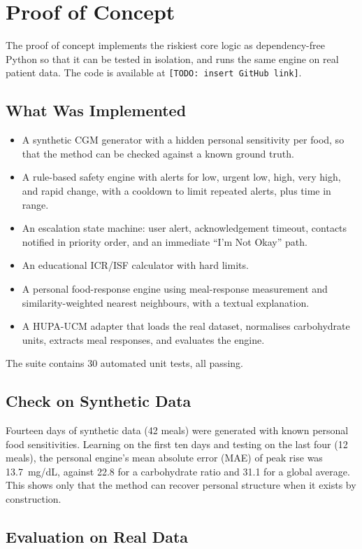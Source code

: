 \chapter{Proof of Concept}

The proof of concept implements the riskiest core logic as dependency-free Python so that it can be tested in isolation, and runs the same engine on real patient data. The code is available at \texttt{[TODO: insert GitHub link]}.

\section{What Was Implemented}
\begin{itemize}
  \item A synthetic CGM generator with a hidden personal sensitivity per food, so that the method can be checked against a known ground truth.
  \item A rule-based safety engine with alerts for low, urgent low, high, very high, and rapid change, with a cooldown to limit repeated alerts, plus time in range.
  \item An escalation state machine: user alert, acknowledgement timeout, contacts notified in priority order, and an immediate ``I'm Not Okay'' path.
  \item An educational ICR/ISF calculator with hard limits.
  \item A personal food-response engine using meal-response measurement and similarity-weighted nearest neighbours, with a textual explanation.
  \item A HUPA-UCM adapter that loads the real dataset, normalises carbohydrate units, extracts meal responses, and evaluates the engine.
\end{itemize}
The suite contains 30 automated unit tests, all passing.

\section{Check on Synthetic Data}
Fourteen days of synthetic data (42 meals) were generated with known personal food sensitivities. Learning on the first ten days and testing on the last four (12 meals), the personal engine's mean absolute error (MAE) of peak rise was 13.7~mg/dL, against 22.8 for a carbohydrate ratio and 31.1 for a global average. This shows only that the method can recover personal structure when it exists by construction.

\section{Evaluation on Real Data}
